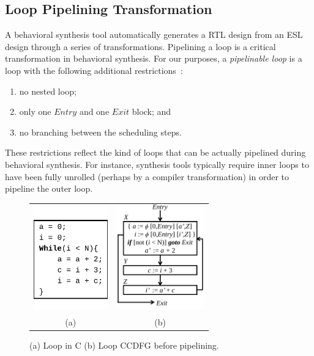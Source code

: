 \subsection{Loop Pipelining Transformation}
\label{subsec:loop-pipelining-trans}
A behavioral synthesis tool automatically generates a RTL design from an ESL design through a series of
transformations. Pipelining a loop is a critical
transformation in behavioral synthesis. For our purposes, a
{\em pipelinable loop} is a loop with the following additional restrictions~\cite{hrx:dac-12}:
\begin{enumerate}
\item no nested loop;
\item only one $Entry$ and one $Exit$ block; and
\item no branching between the scheduling steps.
\end{enumerate}
These restrictions reflect the kind of loops that can be
actually pipelined during behavioral synthesis. For
instance, synthesis tools typically require inner loops to
have been fully unrolled (perhaps by a compiler
transformation) in order to pipeline the outer loop.


\begin{figure}[H]%
\begin{center}
\begin{tabular}{cc}
\includegraphics[height=1.8in]{fig-rpe/C-code}
& \hspace{2cm}
\includegraphics[height=1.8in]{fig-rpe/seq-ccdfg}
\\
(a) & \hspace{2cm} (b) 
\end{tabular}
\end{center}
\caption{(a) Loop in C (b) Loop CCDFG before pipelining.}
\label{fig:high-level-synthesis}
\end{figure}

